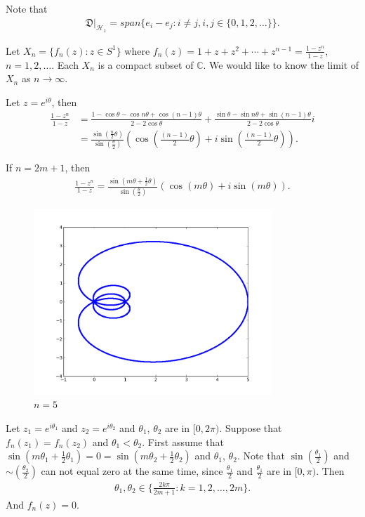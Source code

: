 \documentclass[a4paper,10pt]{amsart}
\newcommand{\HHH}{\mathcal H} %
\newcommand{\DDD}{\mathfrak D}
\newcommand{\C}{\mathbb C} %
\begin{document}
Note that
\begin{align*}
    \DDD|_{\HHH_1} = span \{e_i - e_j : i \neq j, i,j 
    \in \{0, 1, 2, \ldots\} \}.
\end{align*}

Let $X_{n} = \{f_n(z) : z \in S^{1} \}$ where
$f_n(z) = 1 + z + z^2 + \cdots + z^{n-1} = \frac{1-z^{n}}{1-z}$, 
$n = 1, 2, \ldots$. Each $X_n$ is a compact subset of $\C$. We would like 
to know the limit of $X_n$ as $n \to \infty$.

Let $z = e^{i\theta}$, then
\begin{align*}
    \frac{1-z^{n}}{1-z} &= 
    \frac{1-\cos \theta - \cos n\theta + \cos(n-1)\theta}
    {2-2\cos \theta}
    + \frac{\sin \theta - \sin n\theta + \sin(n-1)\theta}
    {2-2\cos \theta} i \\
    &= \frac{\sin (\frac{n}{2}\theta)}
       {\sin (\frac{\theta}{2})} \left (
       \cos (\frac{(n-1)}{2}\theta) + i\sin (\frac{(n-1)}{2}\theta) \right).
\end{align*}

If $n = 2m + 1$, then
\begin{align*}
    \frac{1-z^{n}}{1-z} = 
    \frac{\sin (m\theta + \frac{1}{2}\theta)}
       {\sin (\frac{\theta}{2})} \left (
       \cos (m\theta) + i\sin (m\theta) \right).
\end{align*}

\begin{figure}
    \centering
    \includegraphics[width=0.8\textwidth]{zn5.png}
    \caption{$n=5$}
\end{figure}

Let $z_1 = e^{i\theta_1}$ and $z_2 = e^{i\theta_2}$ and
$\theta_1$, $\theta_2$ are in $[0, 2\pi)$. Suppose that 
$f_{n}(z_1) = f_{n}(z_2)$ and $\theta_1 < \theta_2$. 
First assume that $\sin (m\theta_1 + \frac{1}{2}\theta_1) = 0
= \sin (m\theta_2 + \frac{1}{2}\theta_2)$ and $\theta_1$, $\theta_2$.
Note that $\sin (\frac{\theta_1}{2})$ and $\sim (\frac{\theta_2}{2})$ can
not equal zero at the same time, since $\frac{\theta_1}{2}$ and 
$\frac{\theta_1}{2}$ are in $[0, \pi)$. Then
\begin{align*}
    \theta_1, \theta_2 \in \{\frac{2k\pi}{2m+1} : k = 1, 2, \ldots, 2m\}. 
\end{align*}
And $f_n(z) = 0$.
\end{document}
